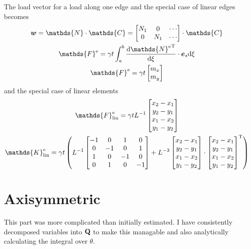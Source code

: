 \documentclass[a4paper,11pt]{article}
\renewcommand{\to}[1]{\text{\boldmath $#1$}} %
\newcommand{\ts}[1]{\text{\boldmath $\rm #1$}} %
\newcommand{\uv}[1]{\mathds{#1}}
\newcommand{\um}[1]{\mathds{#1}}
\newcommand{\intd}[1]{{\rm d}#1}
\newcommand{\dderiv}[2]{\frac{{\rm d}#1}{{\rm d}#2}}
\newcommand{\T}{{\rm T}}
\newcommand{\element}{{\rm e}}
\newcommand{\linear}{{\rm lin}}
\begin{document}
The load vector for a load along one edge and the special case of linear edges becomes
\begin{gather}
 \to w = \um{N}\cdot\um{C} = \begin{bmatrix}N_1 & 0 & \cdots\\ 0 & N_1 & \cdots \end{bmatrix}\cdot \um{C}\\
 \um F^\element = \gamma t \int_a^b \dderiv{{\um N^\element}^\T}{\xi}\cdot \to e_s \intd\xi\\
 \um F^\element = \gamma t \begin{bmatrix}m_x\\m_y\end{bmatrix}
\end{gather}
and the special case of linear elements
\begin{gather}
 \uv F^\element_\linear = \gamma t L^{-1} \begin{bmatrix}x_2-x_1\\y_2-y_1\\x_1-x_2\\y_1-y_2\end{bmatrix}\\
 \um K^\element_\linear = \gamma t \left(
	L^{-1}\begin{bmatrix}-1&0&1&0\\0&-1&0&1\\1&0&-1&0\\0&1&0&-1\end{bmatrix}+
	L^{-3}\begin{bmatrix}x_2-x_1\\y_2-y_1\\x_1-x_2\\y_1-y_2\end{bmatrix}\cdot\begin{bmatrix}x_2-x_1\\y_2-y_1\\x_1-x_2\\y_1-y_2\end{bmatrix}^\T
  \right)
\end{gather}

\section{Axisymmetric}
This part was more complicated than initially estimated.
I have consistently decomposed variables into $\ts Q$ to make this managable and also analytically calculating the integral over $\theta$.
\end{document}
